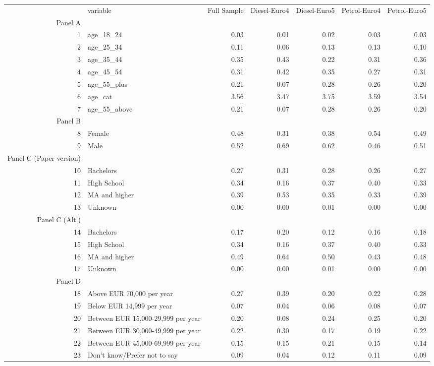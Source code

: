 \begin{table}[ht]
\centering
\begin{tabular}{rlrrrrr}
  \hline
 & variable & Full Sample & Diesel-Euro4 & Diesel-Euro5 & Petrol-Euro4 & Petrol-Euro5 \\ 
  Panel A & \multicolumn{5}{c}{} \\ 
 \hline
1 & age\_18\_24 & 0.03 & 0.01 & 0.02 & 0.03 & 0.03 \\ 
  2 & age\_25\_34 & 0.11 & 0.06 & 0.13 & 0.13 & 0.10 \\ 
  3 & age\_35\_44 & 0.35 & 0.43 & 0.22 & 0.31 & 0.36 \\ 
  4 & age\_45\_54 & 0.31 & 0.42 & 0.35 & 0.27 & 0.31 \\ 
  5 & age\_55\_plus & 0.21 & 0.07 & 0.28 & 0.26 & 0.20 \\ 
  6 & age\_cat & 3.56 & 3.47 & 3.75 & 3.59 & 3.54 \\ 
  7 & age\_55\_above & 0.21 & 0.07 & 0.28 & 0.26 & 0.20 \\ 
   Panel B & \multicolumn{5}{c}{} \\ 
8 & Female & 0.48 & 0.31 & 0.38 & 0.54 & 0.49 \\ 
  9 & Male & 0.52 & 0.69 & 0.62 & 0.46 & 0.51 \\ 
   Panel C (Paper version) & \multicolumn{5}{c}{} \\ 
10 & Bachelors & 0.27 & 0.31 & 0.28 & 0.26 & 0.27 \\ 
  11 & High School & 0.34 & 0.16 & 0.37 & 0.40 & 0.33 \\ 
  12 & MA and higher & 0.39 & 0.53 & 0.35 & 0.33 & 0.39 \\ 
  13 & Unknown & 0.00 & 0.00 & 0.01 & 0.00 & 0.00 \\ 
   Panel C (Alt.) & \multicolumn{5}{c}{} \\ 
14 & Bachelors & 0.17 & 0.20 & 0.12 & 0.16 & 0.18 \\ 
  15 & High School & 0.34 & 0.16 & 0.37 & 0.40 & 0.33 \\ 
  16 & MA and higher & 0.49 & 0.64 & 0.50 & 0.43 & 0.48 \\ 
  17 & Unknown & 0.00 & 0.00 & 0.01 & 0.00 & 0.00 \\ 
   Panel D & \multicolumn{5}{c}{} \\ 
18 & Above EUR 70,000 per year & 0.27 & 0.39 & 0.20 & 0.22 & 0.28 \\ 
  19 & Below EUR 14,999 per year & 0.07 & 0.04 & 0.06 & 0.08 & 0.07 \\ 
  20 & Between EUR 15,000-29,999 per year & 0.20 & 0.08 & 0.24 & 0.25 & 0.20 \\ 
  21 & Between EUR 30,000-49,999 per year & 0.22 & 0.30 & 0.17 & 0.19 & 0.22 \\ 
  22 & Between EUR 45,000-69,999 per year & 0.15 & 0.15 & 0.21 & 0.15 & 0.14 \\ 
  23 & Don't know/Prefer not to say & 0.09 & 0.04 & 0.12 & 0.11 & 0.09 \\ 
   \hline
\end{tabular}
\end{table}
